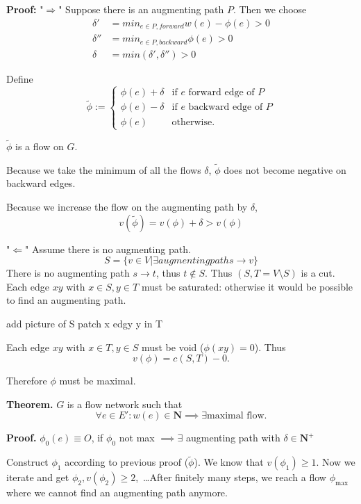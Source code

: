 \textbf{Proof:}
"$\Rightarrow$"
Suppose there is an augmenting path $P$. Then we choose
\begin{align*}
    \delta' &= min_{e \in P, forward} w(e) - \phi(e) > 0 \\
    \delta'' &= min_{e\in P, backward} \phi(e) > 0 \\
    \delta &= min(\delta', \delta'') > 0
\end{align*}

Define
\[
    \tilde\phi := \begin{cases}
        \phi(e) + \delta &\text{if $e$ forward edge of $P$} \\
        \phi(e) - \delta &\text{if $e$ backward edge of $P$} \\
        \phi(e) &\text{otherwise}.
    \end{cases}
\]

$\tilde\phi$ is a flow on $G$.

Because we take the minimum of all the flows $\delta$, $\tilde\phi$ does not become negative on backward edges.

Because we increase the flow on the augmenting path by $\delta$,
\[
    v(\tilde\phi) = v(\phi) + \delta > v(\phi)
\]

"$\Leftarrow$" Assume there is no augmenting path.
\[
    S = \{v\in V | \exists augmenting path s\rightarrow v\}
\]
There is no augmenting path $s\rightarrow t$, thus $t \notin S$.
Thus $(S, T = V\setminus S)$ is a cut.
Each edge $xy$ with $x\in S, y\in T$ must be saturated: otherwise it would be possible to find an augmenting path.

\TODO add picture of S patch x edgy y in T

Each edge $xy$ with $x\in T, y\in S$ must be void ($\phi(xy) = 0$). Thus
\[
    v(\phi) = c(S,T) - 0.
\]

Therefore $\phi$ must be maximal.

\textbf{Theorem.} $G$ is a flow network such that
\[
    \forall e\in E': w(e)\in \mathbf{N} \implies \exists \text{maximal flow}.
\]

\textbf{Proof.} $ \phi_{0}(e) \equiv O$, if $\phi_{0}$ not max $\implies \exists$ augmenting path with $\delta \in \mathbf{N^{+}}$

Construct $\phi_1$ according to previous proof ($\tilde\phi$). We know that $v(\phi_1) ≥ 1$. Now we iterate and get $\phi_2, v(\phi_2) ≥ 2$,~\ldots After finitely many steps, we reach a flow $\phi_{\text{max}}$ where we cannot find an augmenting path anymore.

